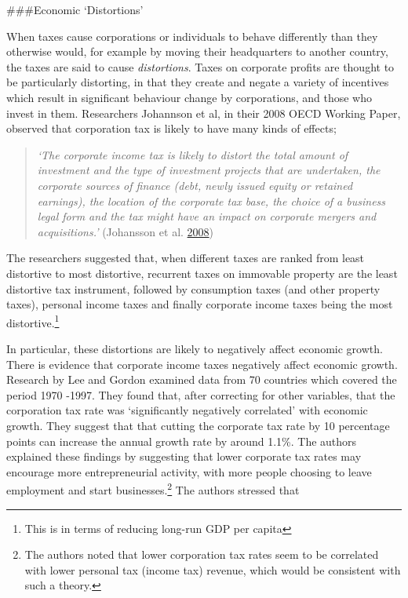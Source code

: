 \documentclass[]{tufte-handout}
\begin{document}
\#\#\#Economic `Distortions'

When taxes cause corporations or individuals to behave differently than
they otherwise would, for example by moving their headquarters to
another country, the taxes are said to cause \emph{distortions}. Taxes
on corporate profits are thought to be particularly distorting, in that
they create and negate a variety of incentives which result in
significant behaviour change by corporations, and those who invest in
them. Researchers Johannson et al, in their 2008 OECD Working Paper,
observed that corporation tax is likely to have many kinds of effects;

\begin{quote}
\emph{`The corporate income tax is likely to distort the total amount of
investment and the type of investment projects that are undertaken, the
corporate sources of finance (debt, newly issued equity or retained
earnings), the location of the corporate tax base, the choice of a
business legal form and the tax might have an impact on corporate
mergers and acquisitions.'} (Johansson et al.
\protect\hyperlink{ref-Johansson2008}{2008})
\end{quote}

The researchers suggested that, when different taxes are ranked from
least distortive to most distortive, recurrent taxes on immovable
property are the least distortive tax instrument, followed by
consumption taxes (and other property taxes), personal income taxes and
finally corporate income taxes being the most distortive.\footnote{This
  is in terms of reducing long-run GDP per capita}

In particular, these distortions are likely to negatively affect
economic growth. There is evidence that corporate income taxes
negatively affect economic growth. Research by Lee and Gordon examined
data from 70 countries which covered the period 1970 -1997. They found
that, after correcting for other variables, that the corporation tax
rate was `significantly negatively correlated' with economic growth.
They suggest that that cutting the corporate tax rate by 10 percentage
points can increase the annual growth rate by around 1.1\%. The authors
explained these findings by suggesting that lower corporate tax rates
may encourage more entrepreneurial activity, with more people choosing
to leave employment and start businesses.\footnote{The authors noted
  that lower corporation tax rates seem to be correlated with lower
  personal tax (income tax) revenue, which would be consistent with such
  a theory.} The authors stressed that
\end{document}
